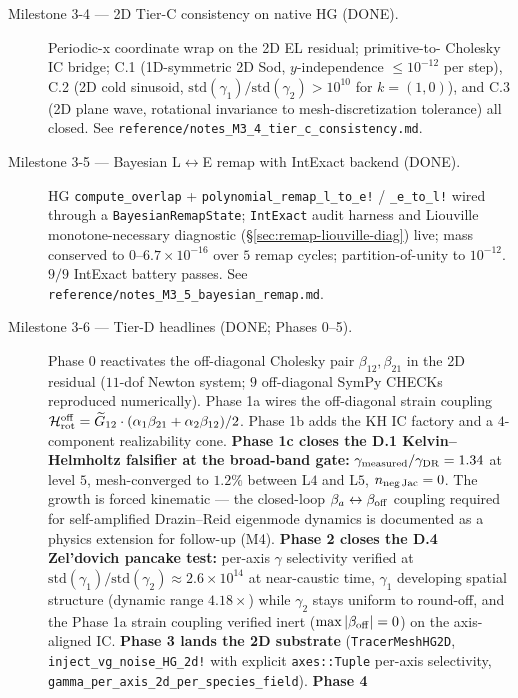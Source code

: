 \documentclass[11pt]{article}
\begin{document}
\begin{description}
\item[Milestone 3-4 --- 2D Tier-C consistency on native HG (DONE).]
Periodic-x coordinate wrap on the 2D EL residual; primitive-to-
Cholesky IC bridge; C.1 (1D-symmetric 2D Sod, $y$-independence
$\le 10^{-12}$ per step), C.2 (2D cold sinusoid, $\mathrm{std}
(\gamma_1)/\mathrm{std}(\gamma_2) > 10^{10}$ for
$k = (1, 0)$), and C.3 (2D plane wave, rotational invariance to
mesh-discretization tolerance) all closed. See
\verb|reference/notes_M3_4_tier_c_consistency.md|.
\item[Milestone 3-5 --- Bayesian L$\leftrightarrow$E remap with
IntExact backend (DONE).] HG \texttt{compute\_overlap} +
\texttt{polynomial\_remap\_l\_to\_e!} / \texttt{\_e\_to\_l!}
wired through a \texttt{BayesianRemapState}; \texttt{IntExact}
audit harness and Liouville monotone-necessary diagnostic
(\S\ref{sec:remap-liouville-diag}) live; mass conserved to
$0\text{--}6.7\times 10^{-16}$ over $5$ remap cycles;
partition-of-unity to $10^{-12}$. $9/9$ IntExact battery passes.
See \verb|reference/notes_M3_5_bayesian_remap.md|.
\item[Milestone 3-6 --- Tier-D headlines (DONE; Phases 0--5).]
Phase 0 reactivates the off-diagonal Cholesky pair
$\beta_{12}, \beta_{21}$ in the 2D residual ($11$-dof Newton
system; $9$ off-diagonal SymPy CHECKs reproduced numerically).
Phase 1a wires the off-diagonal strain coupling
$\mathcal H_{\rm rot}^{\rm off} = \widetilde G_{12}\cdot
(\alpha_1\beta_{21} + \alpha_2\beta_{12})/2$. Phase 1b adds the
KH IC factory and a $4$-component realizability cone.
\textbf{Phase 1c closes the D.1 Kelvin--Helmholtz falsifier at the
broad-band gate:} $\gamma_{\rm measured}/\gamma_{\rm DR} = 1.34$
at level $5$, mesh-converged to $1.2\%$ between L$4$ and L$5$,
$n_{\rm neg\,Jac} = 0$. The growth is forced kinematic --- the
closed-loop $\beta_a \leftrightarrow \beta_{\rm off}$ coupling
required for self-amplified Drazin--Reid eigenmode dynamics is
documented as a physics extension for follow-up (M4). \textbf{Phase
2 closes the D.4 Zel'dovich pancake test:} per-axis $\gamma$
selectivity verified at $\mathrm{std}(\gamma_1)/\mathrm{std}
(\gamma_2) \approx 2.6\times 10^{14}$ at near-caustic time,
$\gamma_1$ developing spatial structure (dynamic range $4.18\times$)
while $\gamma_2$ stays uniform to round-off, and the Phase 1a strain
coupling verified inert ($\max|\beta_{\rm off}| = 0$) on the axis-
aligned IC. \textbf{Phase 3 lands the 2D substrate}
(\texttt{TracerMeshHG2D}, \texttt{inject\_vg\_noise\_HG\_2d!} with
explicit \texttt{axes::Tuple} per-axis selectivity,
\texttt{gamma\_per\_axis\_2d\_per\_species\_field}). \textbf{Phase 4
}
\end{description}
\end{document}
